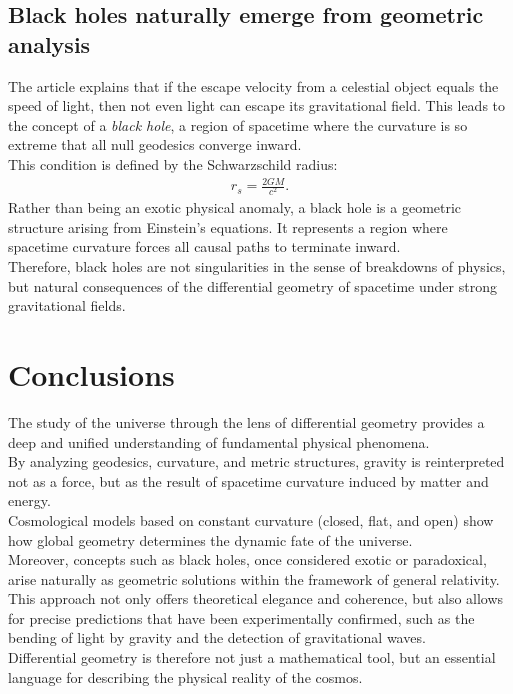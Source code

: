 \documentclass{aleph-revista}
\begin{document}
\subsection*{Black holes naturally emerge from geometric analysis}
The article explains that if the escape velocity from a celestial object equals the speed of light, then not even light can escape its gravitational field. This leads to the concept of a \textit{black hole}, a region of spacetime where the curvature is so extreme that all null geodesics converge inward.\\
This condition is defined by the Schwarzschild radius:
\begin{align*}
r_s = \frac{2GM}{c^2}.
\end{align*}
Rather than being an exotic physical anomaly, a black hole is a geometric structure arising from Einstein's equations. It represents a region where spacetime curvature forces all causal paths to terminate inward.\\
Therefore, black holes are not singularities in the sense of breakdowns of physics, but natural consequences of the differential geometry of spacetime under strong gravitational fields.
\section{Conclusions}
The study of the universe through the lens of differential geometry provides a deep and unified understanding of fundamental physical phenomena.\\
By analyzing geodesics, curvature, and metric structures, gravity is reinterpreted not as a force, but as the result of spacetime curvature induced by matter and energy.\\
Cosmological models based on constant curvature (closed, flat, and open) show how global geometry determines the dynamic fate of the universe.\\
Moreover, concepts such as black holes, once considered exotic or paradoxical, arise naturally as geometric solutions within the framework of general relativity.\\
This approach not only offers theoretical elegance and coherence, but also allows for precise predictions that have been experimentally confirmed, such as the bending of light by gravity and the detection of gravitational waves.\\
Differential geometry is therefore not just a mathematical tool, but an essential language for describing the physical reality of the cosmos.
\newpage
\nocite{*}
\printbibliography
\end{document}
